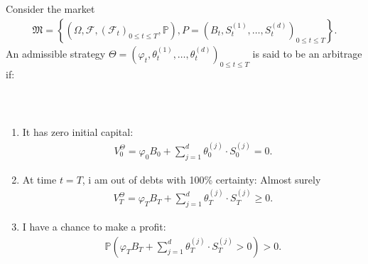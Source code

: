 \documentclass{beamer}
\numberwithin{equation}{section}
\begin{document}
\begin{frame}\frametitle{{\normalsize \secname} \\ {\large \subsecname}}
    \begin{definition}[Arbitrage]
        Consider the market
        \begin{align}
            \mathfrak{M} =
            \left\{
                \left(
                    \Omega, 
                    \mathscr{F}, 
                    \left(
                        \mathscr{F}_t
                    \right)_{0 \leq t \leq T},
                    \mathbb{P}
                \right),
                P =
                \left(
                    B_t,
                    S_t^{(1)},
                    \ldots,
                    S_t^{(d)}
                \right)_{0 \leq t \leq T}
            \right\}.
        \end{align}
        An admissible strategy $\Theta = \left(\varphi_t, \theta_t^{(1)}, \ldots, \theta_t^{(d)}\right)_{0 \leq t \leq T}$ is said to be an arbitrage if:
    \end{definition}
\end{frame}

\begin{frame}\frametitle{{\normalsize \secname} \\ {\large \subsecname}}
    \begingroup
    \small
    \begin{enumerate}
        \item It has zero initial capital:
        \begin{align}
            V_0^\Theta = \varphi_0B_0 + \sum_{j = 1}^d\theta_0^{(j)} \cdot S_0^{(j)} = 0.
        \end{align}
        \item At time $t = T$, i am out of debts with 100\% certainty: Almost surely
        \begin{align}
            V_T^\Theta = \varphi_T B_T + \sum_{j = 1}^d\theta_T^{(j)} \cdot S_T^{(j)} \geq 0.
        \end{align}
        \item I have a chance to make a profit:
        \begin{align}
            \mathbb{P}
            \left(
                \varphi_TB_T + \sum_{j = 1}^d \theta_T^{(j)} \cdot S_T^{(j)} > 0
            \right) > 0.
        \end{align}
    \end{enumerate}
    \endgroup
\end{frame}
\end{document}
